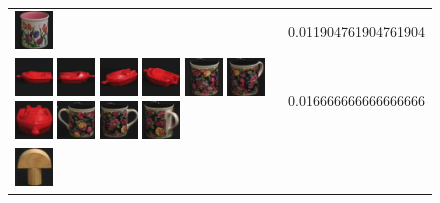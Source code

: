 \begin{figure}[tbp]
\begin{center}
\begin{tabular}{m{11cm} | m{3cm} |}
\includegraphics[width=1cm]{coil/beeld-8.eps}
& {\scriptsize 0.011904761904761904}
\\
\includegraphics[width=1cm]{coil/beeld-18.eps}
\includegraphics[width=1cm]{coil/beeld-19.eps}
\includegraphics[width=1cm]{coil/beeld-21.eps}
\includegraphics[width=1cm]{coil/beeld-22.eps}
\includegraphics[width=1cm]{coil/beeld-62.eps}
\includegraphics[width=1cm]{coil/beeld-63.eps}
\includegraphics[width=1cm]{coil/beeld-20.eps}
\includegraphics[width=1cm]{coil/beeld-61.eps}
\includegraphics[width=1cm]{coil/beeld-60.eps}
\includegraphics[width=1cm]{coil/beeld-64.eps}
& {\scriptsize 0.016666666666666666}
\\
\includegraphics[width=1cm]{coil/beeld-0.eps}

\end{tabular}
\end{center}
\end{figure}
